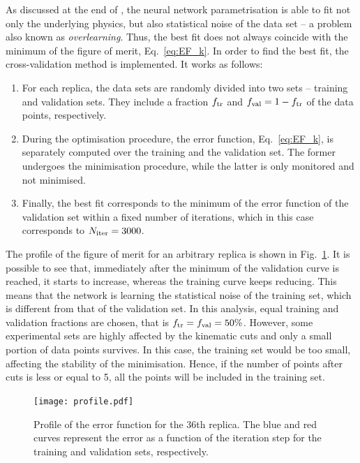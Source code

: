 As discussed at the end of , the neural network parametrisation is able to fit not only the underlying physics, but also statistical noise of the data set -- a problem also known as \textit{overlearning}. Thus, the best fit does not always coincide with the minimum of the figure of merit, Eq.~\eqref{eq:EF_k}. In order to find the best fit, the cross-validation method \cite{pml1Book} is implemented. It works as follows:
\begin{enumerate}
  \item For each replica, the data sets are randomly divided into two sets -- training and validation sets. They include a fraction $f_{\textrm{tr}}$ and $f_{\textrm{val}} = 1 - f_{\textrm{tr}}$ of the data points, respectively.
  \item During the optimisation procedure, the error function, Eq.~\eqref{eq:EF_k}, is separately computed over the training and the validation set. The former undergoes the minimisation procedure, while the latter is only monitored and not minimised.
  \item Finally, the best fit corresponds to the minimum of the error function of the validation set within a fixed number of iterations, which in this case corresponds to $N_{\textrm{iter}} = 3000$.
\end{enumerate}
The profile of the figure of merit for an arbitrary replica is shown in Fig.~\ref{fig:profile}. It is possible to see that, immediately after the minimum of the validation curve is reached, it starts to increase, whereas the training curve keeps reducing. This means that the network is learning the statistical noise of the training set, which is different from that of the validation set. In this analysis, equal training and validation fractions are chosen, that is $f_{\textrm{tr}} = f_{\textrm{val}} = 50\%$. However, some experimental sets are highly affected by the kinematic cuts and only a small portion of data points survives. In this case, the training set would be too small, affecting the stability of the minimisation. Hence, if the number of points after cuts is less or equal to 5, all the points will be included in the training set.

\begin{figure}[t]
  \centering
  \texttt{[image: profile.pdf]} 
  \caption{\small{Profile of the error function for the 36th replica. The blue and red curves represent the error as a function of the iteration step for the training and validation sets, respectively.}}
  \label{fig:profile}
\end{figure}


